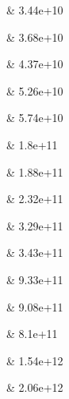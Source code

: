 & 3.44e+10

& 3.68e+10

& 4.37e+10

& 5.26e+10

& 5.74e+10

& 1.8e+11

& 1.88e+11

& 2.32e+11

& 3.29e+11

& 3.43e+11

& 9.33e+11

& 9.08e+11

& 8.1e+11

& 1.54e+12

& 2.06e+12


